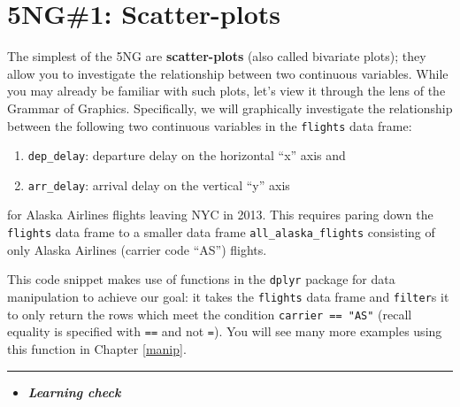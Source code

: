 \documentclass[]{tufte-book}
\newenvironment{Shaded}{\begin{snugshade}}{\end{snugshade}}
\newcommand{\KeywordTok}[1]{\textcolor[rgb]{0.13,0.29,0.53}{\textbf{{#1}}}}
\newcommand{\StringTok}[1]{\textcolor[rgb]{0.31,0.60,0.02}{{#1}}}
\newcommand{\NormalTok}[1]{{#1}}
\let\oldrule=\rule
\renewcommand{\rule}[1]{\oldrule{\linewidth}}
\providecommand{\tightlist}{%
  \setlength{\itemsep}{0pt}\setlength{\parskip}{0pt}}
\newenvironment{rmdblock}[1]
  {\begin{shaded*}
  \begin{itemize}
  \renewcommand{\labelitemi}{
    \raisebox{-.7\height}[0pt][0pt]{
    }
  }
  \item
  }
  {
  \end{itemize}
  \end{shaded*}
  }
\newenvironment{learncheck}
  {\begin{rmdblock}{warning}}
  {\end{rmdblock}}
\begin{document}
\section{5NG\#1: Scatter-plots}\label{scatterplots}

The simplest of the 5NG are \textbf{scatter-plots} (also called
bivariate plots); they allow you to investigate the relationship between
two continuous variables. While you may already be familiar with such
plots, let's view it through the lens of the Grammar of Graphics.
Specifically, we will graphically investigate the relationship between
the following two continuous variables in the \texttt{flights} data
frame:

\begin{enumerate}
\def\labelenumi{\arabic{enumi}.}
\tightlist
\item
  \texttt{dep\_delay}: departure delay on the horizontal ``x'' axis and
\item
  \texttt{arr\_delay}: arrival delay on the vertical ``y'' axis
\end{enumerate}

for Alaska Airlines flights leaving NYC in 2013. This requires paring
down the \texttt{flights} data frame to a smaller data frame
\texttt{all\_alaska\_flights} consisting of only Alaska Airlines
(carrier code ``AS'') flights.

\begin{Shaded}
\end{Shaded}

This code snippet makes use of functions in the \texttt{dplyr} package
for data manipulation to achieve our goal: it takes the \texttt{flights}
data frame and \texttt{filter}s it to only return the rows which meet
the condition \texttt{carrier\ ==\ "AS"} (recall equality is specified
with \texttt{==} and not \texttt{=}). You will see many more examples
using this function in Chapter \ref{manip}.

\begin{center}\rule{0.5\linewidth}{\linethickness}\end{center}

\begin{learncheck}
\textbf{\emph{Learning check}}
\end{learncheck}
\end{document}
